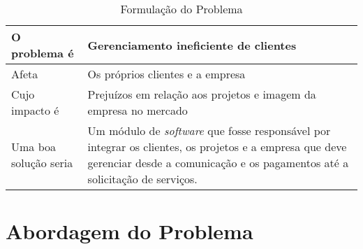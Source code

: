       
      \begin{table}[!htbp]
        \centering
        \caption{Formulação do Problema}
        \label{Formulação Do Problema}
        \begin{tabularx}{0.9\textwidth}{|>{}s |b|}
          \hline
            O problema é           & Gerenciamento ineficiente de clientes                               \\ \hline
            Afeta                  & Os próprios clientes e a empresa                                    \\ \hline
            Cujo impacto é         & Prejuízos em relação aos projetos e imagem da empresa no mercado    \\ \hline
            Uma boa solução seria  & Um módulo de \textit{software} que fosse responsável por integrar os clientes, os projetos e a empresa que deve gerenciar desde a comunicação e os pagamentos até a solicitação de serviços.                                                                        \\ \hline
        \end{tabularx}
      \end{table}

  \section{Abordagem do Problema}

